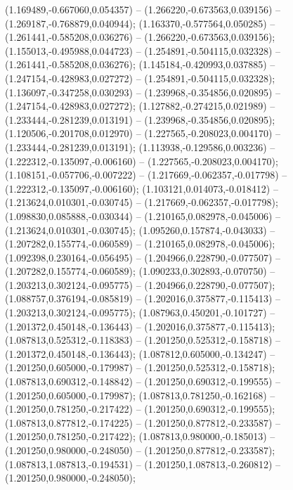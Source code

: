  (1.169489,-0.667060,0.054357) -- (1.266220,-0.673563,0.039156) -- (1.269187,-0.768879,0.040944);
 (1.163370,-0.577564,0.050285) -- (1.261441,-0.585208,0.036276) -- (1.266220,-0.673563,0.039156);
 (1.155013,-0.495988,0.044723) -- (1.254891,-0.504115,0.032328) -- (1.261441,-0.585208,0.036276);
 (1.145184,-0.420993,0.037885) -- (1.247154,-0.428983,0.027272) -- (1.254891,-0.504115,0.032328);
 (1.136097,-0.347258,0.030293) -- (1.239968,-0.354856,0.020895) -- (1.247154,-0.428983,0.027272);
 (1.127882,-0.274215,0.021989) -- (1.233444,-0.281239,0.013191) -- (1.239968,-0.354856,0.020895);
 (1.120506,-0.201708,0.012970) -- (1.227565,-0.208023,0.004170) -- (1.233444,-0.281239,0.013191);
 (1.113938,-0.129586,0.003236) -- (1.222312,-0.135097,-0.006160) -- (1.227565,-0.208023,0.004170);
 (1.108151,-0.057706,-0.007222) -- (1.217669,-0.062357,-0.017798) -- (1.222312,-0.135097,-0.006160);
 (1.103121,0.014073,-0.018412) -- (1.213624,0.010301,-0.030745) -- (1.217669,-0.062357,-0.017798);
 (1.098830,0.085888,-0.030344) -- (1.210165,0.082978,-0.045006) -- (1.213624,0.010301,-0.030745);
 (1.095260,0.157874,-0.043033) -- (1.207282,0.155774,-0.060589) -- (1.210165,0.082978,-0.045006);
 (1.092398,0.230164,-0.056495) -- (1.204966,0.228790,-0.077507) -- (1.207282,0.155774,-0.060589);
 (1.090233,0.302893,-0.070750) -- (1.203213,0.302124,-0.095775) -- (1.204966,0.228790,-0.077507);
 (1.088757,0.376194,-0.085819) -- (1.202016,0.375877,-0.115413) -- (1.203213,0.302124,-0.095775);
 (1.087963,0.450201,-0.101727) -- (1.201372,0.450148,-0.136443) -- (1.202016,0.375877,-0.115413);
 (1.087813,0.525312,-0.118383) -- (1.201250,0.525312,-0.158718) -- (1.201372,0.450148,-0.136443);
 (1.087812,0.605000,-0.134247) -- (1.201250,0.605000,-0.179987) -- (1.201250,0.525312,-0.158718);
 (1.087813,0.690312,-0.148842) -- (1.201250,0.690312,-0.199555) -- (1.201250,0.605000,-0.179987);
 (1.087813,0.781250,-0.162168) -- (1.201250,0.781250,-0.217422) -- (1.201250,0.690312,-0.199555);
 (1.087813,0.877812,-0.174225) -- (1.201250,0.877812,-0.233587) -- (1.201250,0.781250,-0.217422);
 (1.087813,0.980000,-0.185013) -- (1.201250,0.980000,-0.248050) -- (1.201250,0.877812,-0.233587);
 (1.087813,1.087813,-0.194531) -- (1.201250,1.087813,-0.260812) -- (1.201250,0.980000,-0.248050);
